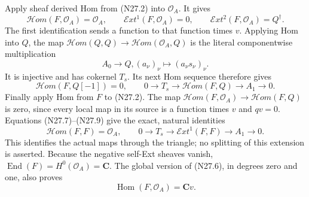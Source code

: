 Apply sheaf derived Hom from (N27.2) into $\mathcal O_A$.
It gives
\[
 \mathcal H om(F,\mathcal O_A)=\mathcal O_A,
 \qquad \mathcal E xt^1(F,\mathcal O_A)=0,
 \qquad \mathcal E xt^2(F,\mathcal O_A)=Q^\dagger.
                                                               \tag{N27.7}
\]
The first identification sends a function to that function
times $v$. Applying Hom into $Q$, the map
$\mathcal H om(Q,Q)\to\mathcal H om(\mathcal O_A,Q)$
is the literal componentwise multiplication
\[
                  A_0\longrightarrow Q,
                    (a_\nu)_\nu\longmapsto(a_\nu s_\nu)_\nu.
                                                               \tag{N27.8}
\]
It is injective and has cokernel $T_s$. Its next Hom
sequence therefore gives
\[
 \mathcal H om(F,Q[-1])=0,\qquad
 0\longrightarrow T_s\longrightarrow\mathcal H om(F,Q)
                       \longrightarrow A_1\longrightarrow0.
                                                               \tag{N27.9}
\]
Finally apply Hom from $F$ to (N27.2). The map
$\mathcal H om(F,\mathcal O_A)\to\mathcal H om(F,Q)$
is zero, since every local map in its source is a function
times $v$ and $qv=0$. Equations (N27.7)--(N27.9) give
the exact, natural identities
\[
 \mathcal H om(F,F)=\mathcal O_A,
 \qquad
 0\longrightarrow T_s\longrightarrow\mathcal E xt^1(F,F)
                          \longrightarrow A_1\longrightarrow0.
                                                               \tag{N27.10}
\]
This identifies the actual maps through the triangle;
no splitting of this extension is asserted.
Because the negative self-Ext sheaves vanish,
$\operatorname{End}(F)=H^0(\mathcal O_A)=\mathbf C$.
The global version of (N27.6), in degrees zero and one,
also proves
\[
                      \operatorname{Hom}(F,\mathcal O_A)
                                             =\mathbf C v.
                                                               \tag{N27.11}
\]

